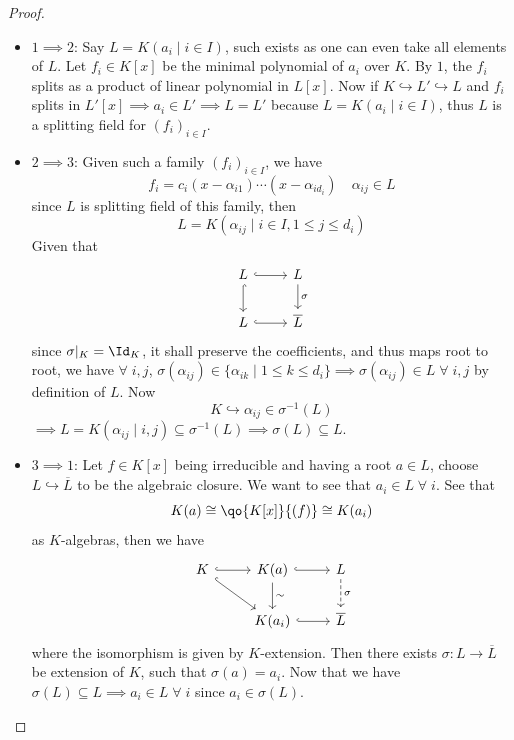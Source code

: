 \begin{proof}
	\leavevmode
	\begin{itemize}
		\item \( 1\implies 2 \): Say \( L = K(a_i \; | \; i \in I) \), such exists as one can even take
		      all elements of \( L \). Let \( f_i \in K[x] \) be the minimal polynomial of \( a_i \) over \( K \). By
		      \( 1 \), the \( f_i \) splits as a product of linear polynomial in \( L[x] \). Now if \( K
		      \hookrightarrow L' \hookrightarrow L \) and \( f_i \) splits in \( L'[x] \implies a_i \in L' \implies L = L' \) because
		      \( L = K(a_i \; | \; i \in I) \), thus \( L \) is a splitting field for \( (f_i)_{i\in I} \).
		\item \( 2 \implies 3 \): Given such a family \( (f_i)_{i\in I} \), we have
		      \[
			      f_i = c_i (x-\alpha_{i 1}) \cdots (x-\alpha_{i d_i}) \quad \alpha_{ij} \in L
		      \]
		      since \( L \) is  splitting field of this family, then
		      \[
			      L = K(\alpha_{ij} \; | \; i \in I, 1\leq j \leq d_i)
		      \]
		      Given that
		      \[
			      \begin{tikzcd}
				      L \arrow[r, hook] \arrow[d,hook] & L \arrow[d, "\sigma"] \\
				      L \arrow[r,hook] & \overline{L}
			      \end{tikzcd}
		      \]
		      since \( \sigma|_{K} = \Id_{K} \), it shall preserve the coefficients, and thus maps root to
		      root, we have \( \forall \; i,j \), \( \sigma(\alpha_{ij}) \in \{\alpha_{ik} \; | \; 1 \leq k
		      \leq d_i\} \implies \sigma(\alpha_{ij}) \in L \; \forall \; i,j \) by definition of \( L \). Now
		      \[
			      K \hookrightarrow \alpha_{ij} \in \sigma^{-1} (L)
		      \]
		      \( \implies L = K(\alpha_{ij} \; | \; i,j) \subseteq \sigma^{-1}(L) \implies \sigma(L)
		      \subseteq L \).
		\item \( 3 \implies 1 \): Let \( f \in K[x] \) being irreducible and having a root \( a  \in
		      L\), choose \( L \hookrightarrow \overline{L} \) to be the algebraic closure. We want to see
		      that \( a_i\in L \; \forall \; i \). See that
		      \[
			      K(a) \cong \qo{K[x]}{(f)} \cong K(a_i)
		      \]
		      as \( K \)-algebras, then we have
		      \[
			      \begin{tikzcd}
				      K \arrow[r,hook]\arrow[rd,hook] & K(a) \arrow[d,"\sim"] \arrow[r,hook] & L \arrow[dashed,
					      d, "\sigma"] \\
				      & K(a_i) \arrow[r,hook] & \overline{L}
			      \end{tikzcd}
		      \]
		      where the isomorphism is given by \( K \)-extension. Then there exists \( \sigma : L \to
		      \overline{L} \) be extension of \( K \), such that \( \sigma(a) = a_i \). Now that we have \(
		      \sigma(L) \subseteq L \implies a_i \in L \; \forall \; i\) since \( a_i\in \sigma(L) \).
	\end{itemize}
\end{proof}

